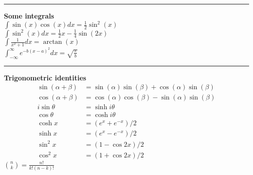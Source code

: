 \documentclass[10pt]{article} %
\begin{document}
\begin{multicols}{4}
{\begin{flushleft}
            \vspace{0.1cm}
            \hrule
            \vspace{0.1cm}
            \textbf{Some integrals}\\
            \(
            \int \sin(x)\cos(x)dx = \frac{1}{2}\sin^2(x)
            \)\\
            \(
            \int \sin^2(x)dx = \frac{1}{2}x - \frac{1}{4}\sin(2x)
            \)\\
            \(
            \int \frac{1}{x^2+1} dx = \arctan(x)
            \)\\
            \(
            \int_{-\infty}^{\infty} e^{-b(x-a)^2}dx = \sqrt{\frac{\pi}{b}}
            \)\\
            \vspace{0.1cm}
            \hrule
            \vspace{0.1cm}

            \textbf{Trigonometric identities}
            \begin{align*}
                \sin(\alpha +\beta) & = \sin(\alpha)\sin(\beta) + \cos(\alpha)\sin(\beta) \\
                \cos(\alpha+\beta)  & = \cos(\alpha)\cos(\beta) - \sin(\alpha)\sin(\beta) \\
                i \sin \theta       & = \sinh {i\theta}                                   \\
                \cos \theta         & = \cosh {i\theta}                                   \\
                \cosh x             & = (e^x+e^{-x})/2                                    \\
                \sinh x             & = (e^x-e^{-x})/2                                    \\
                \sin^2 x            & = (1-\cos{2x})/2                                    \\
                \cos^2 x            & = (1+\cos{2x})/2
            \end{align*}
            \(
            \binom{n}{k} = \frac{n!}{k!(n-k)!}
            \)
        \end{flushleft}
    }
\end{multicols}
\end{document}
